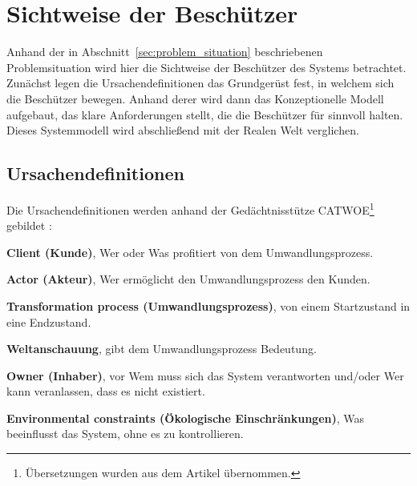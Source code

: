 \documentclass[11pt,a4paper]{report}
\begin{document}

\section{Sichtweise der Beschützer} 

Anhand der in Abschnitt~\ref{sec:problem_situation} beschriebenen Problemsituation wird hier die Sichtweise der Beschützer des Systems betrachtet. Zunächst legen die Ursachendefinitionen das Grundgerüst fest, in welchem sich die Beschützer bewegen. Anhand derer wird dann das Konzeptionelle Modell aufgebaut, das klare Anforderungen stellt, die die Beschützer für sinnvoll halten. Dieses Systemmodell wird abschließend mit der Realen Welt verglichen.

\subsection{Ursachendefinitionen}

Die Ursachendefinitionen werden anhand der Gedächtnisstütze CATWOE\footnote{Übersetzungen wurden aus dem Artikel \cite{ssmger} übernommen.} gebildet \cite{bobwill}:

\begin{description}
\item \textbf{Client (Kunde)}, Wer oder Was profitiert von dem Umwandlungsprozess.
\item \textbf{Actor (Akteur)}, Wer ermöglicht den Umwandlungsprozess den Kunden.
\item \textbf{Transformation process (Umwandlungsprozess)}, von einem Startzustand in eine Endzustand.
\item \textbf{Weltanschauung}, gibt dem Umwandlungsprozess Bedeutung.
\item \textbf{Owner (Inhaber)}, vor Wem muss sich das System verantworten und/oder Wer kann veranlassen, dass es nicht existiert.
\item \textbf{Environmental constraints (Ökologische Einschränkungen)}, Was beeinflusst das System, ohne es zu kontrollieren.
\end{description}
\end{document}
